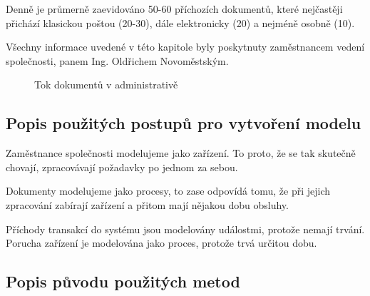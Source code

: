 \documentclass[12pt,a4paper]{article}
\begin{document}
Denně je průmerně zaevidováno 50-60 příchozích dokumentů, které nejčastěji při\-chá\-zí klasickou poštou (20-30), dále elektronicky (20) a nejméně osobně (10).

Všechny informace uvedené v této kapitole byly poskytnuty zaměstnancem vedení spo\-leč\-nos\-ti, panem Ing. Oldřichem Novoměstským.

\begin{figure}[ht]
 \begin{center}
	\caption{Tok dokumentů v administrativě}
	\label{tok_dokumentu}
 \end{center}
\end{figure}

\subsection{Popis použitých postupů pro vytvoření modelu}

Zaměstnance společnosti modelujeme jako zařízení. To proto, že se tak skutečně chovají, zpracovávají požadavky po jednom za sebou.

Dokumenty modelujeme jako procesy, to zase odpovídá tomu, že při jejich zpracování zabírají zařízení a přitom mají nějakou dobu obsluhy.

Příchody transakcí do systému jsou modelovány událostmi, protože nemají trvání. Po\-ru\-cha zařízení je modelována jako proces, protože trvá určitou dobu.

\subsection{Popis původu použitých metod}
\end{document}

